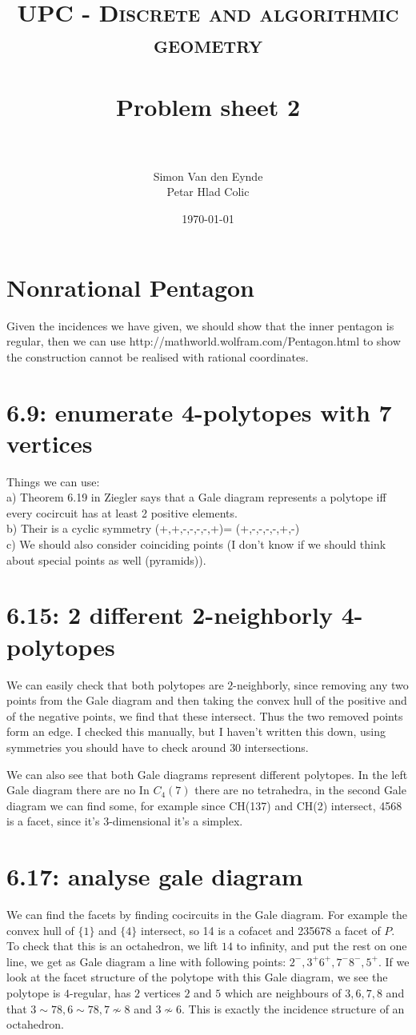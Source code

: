 \documentclass[paper=a4, fontsize=11pt]{scrartcl} %
\title{	
\normalfont \normalsize 
\textsc{UPC - Discrete and algorithmic geometry} \\ [25pt] %
\horrule{0.5pt} \\[0.4cm] %
\huge Problem sheet 2  \\ %
\horrule{2pt} \\[0.5cm] %
}
\author{Simon Van den Eynde \\ Petar Hlad Colic} %
\date{\normalsize\today} %
\theoremstyle{plain}
\begin{document}
\maketitle %

\section{Nonrational Pentagon}
Given the incidences we have given, we should show that the inner pentagon is regular, then we can use http://mathworld.wolfram.com/Pentagon.html to show the construction cannot be realised with rational coordinates.

\section{6.9: enumerate 4-polytopes with 7 vertices}
Things we can use: \\
a) Theorem 6.19 in Ziegler says that a Gale diagram represents a polytope iff every cocircuit has at least 2 positive elements.\\

b) Their is a cyclic symmetry (+,+,-,-,-,-,+)= (+,-,-,-,-,+,-)\\

c) We should also consider coinciding points (I don't know if we should think about special points as well (pyramids)).

\section{6.15: 2 different 2-neighborly 4-polytopes}
We can easily check that both polytopes are $2$-neighborly, since removing any two points from the Gale diagram and then taking the convex hull of the positive and of the negative points, we find that these intersect. Thus the two removed points form an edge. I checked this manually, but I haven't written this down, using symmetries you should have to check around $30$ intersections.

We can also see that both Gale diagrams represent different polytopes. In the left Gale diagram there are no 
In $C_{4}(7)$ there are no tetrahedra, in the second Gale diagram we can find some, for example since CH(137) and CH(2) intersect, 4568 is a facet, since it's 3-dimensional it's a simplex.
 
\section{6.17: analyse gale diagram}
We can find the facets by finding cocircuits in the Gale diagram. For example the convex hull of $\{1\}$ and $\{4\}$ intersect, so 14 is a cofacet and 235678 a facet of $P$. To check that this is an octahedron, we lift $14$ to infinity, and put the rest on one line, we get as Gale diagram a line with following points: $2^-,3^+6^+,7^-8^-,5^+$. If we look at the facet structure of the polytope with this Gale diagram, we see the polytope is $4$-regular, has $2$ vertices $2$ and $5$ which are neighbours of $3,6,7,8$ and that $3\sim 78,6\sim 78, 7\not\sim 8$ and $3\not\sim 6$. This is exactly the incidence structure of an octahedron.
\end{document}
